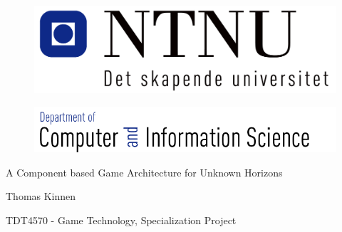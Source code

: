 \pagestyle{empty}

\begin{titlepage}
\begin{center}

\begin{figure}[!htb]
	\begin{center}
		\includegraphics[scale=0.50]{pics/ntnu}
	\end{center}
\end{figure}
\begin{figure}[!htb]
	\begin{center}
		\includegraphics[scale=0.40]{pics/idi}
	\end{center}
\end{figure}
\begin{LARGE}
\vspace{1.2in}

\end{LARGE}
\begin{Huge}
A Component based Game Architecture for Unknown Horizons\vspace{1.2in}
\vspace{1.7in}


\end{Huge}
\begin{LARGE}
Thomas Kinnen \vspace{0.6in}
\end{LARGE}

\begin{Large}
TDT4570 - Game Technology, Specialization Project
\vspace{0.8in}
\end{Large}



\end{center}

\end{titlepage}
